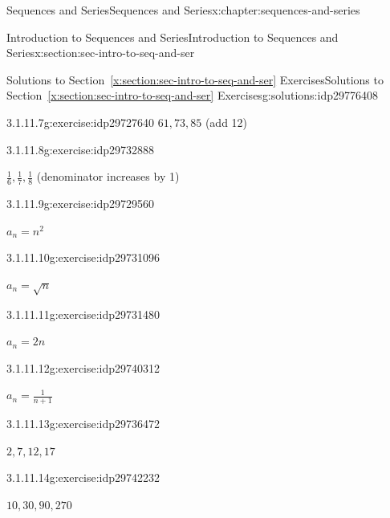 \documentclass[twoside,10pt,]{book}
\newcommand{\xreffont}{\relax}
\numberwithin{equation}{section}
\begin{document}
\begin{chapterptx}{Sequences and Series}{}{Sequences and Series}{}{}{x:chapter:sequences-and-series}
\begin{sectionptx}{Introduction to Sequences and Series}{}{Introduction to Sequences and Series}{}{}{x:section:sec-intro-to-seq-and-ser}
\begin{solutions-subsection}{Solutions to Section~{\xreffont\ref*{x:section:sec-intro-to-seq-and-ser}} Exercises}{}{Solutions to Section~{\xreffont\ref*{x:section:sec-intro-to-seq-and-ser}} Exercises}{}{}{g:solutions:idp29776408}
\begin{exercisegroup}
\begin{divisionsolutioneg}{3.1.11.7}{}{g:exercise:idp29727640}
\noindent\hypertarget{g:solution:idp29730712-main}{}\(61, 73, 85\) (add 12)\end{divisionsolutioneg}%
\begin{divisionsolutioneg}{3.1.11.8}{}{g:exercise:idp29732888}%
\par\smallskip%
\noindent\hypertarget{g:solution:idp29728920-main}{}\(\frac{1}{6},\frac{1}{7},\frac{1}{8}\) (denominator increases by 1)\end{divisionsolutioneg}%
\end{exercisegroup}
\par\medskip\noindent
\begin{exercisegroup}
\begin{divisionsolutioneg}{3.1.11.9}{}{g:exercise:idp29729560}%
\par\smallskip%
\noindent\hypertarget{g:solution:idp29728024-main}{}\(a_n = n^2\)\end{divisionsolutioneg}%
\begin{divisionsolutioneg}{3.1.11.10}{}{g:exercise:idp29731096}%
\par\smallskip%
\noindent\hypertarget{g:solution:idp29727384-main}{}\(a_n = \sqrt{n} \)\end{divisionsolutioneg}%
\begin{divisionsolutioneg}{3.1.11.11}{}{g:exercise:idp29731480}%
\par\smallskip%
\noindent\hypertarget{g:solution:idp29728536-main}{}\(a_n = 2n\)\end{divisionsolutioneg}%
\begin{divisionsolutioneg}{3.1.11.12}{}{g:exercise:idp29740312}%
\par\smallskip%
\noindent\hypertarget{g:solution:idp29736600-main}{}\(a_n = \frac{1}{n + 1}\)\end{divisionsolutioneg}%
\end{exercisegroup}
\par\medskip\noindent
\begin{exercisegroup}
\begin{divisionsolutioneg}{3.1.11.13}{}{g:exercise:idp29736472}%
\par\smallskip%
\noindent\hypertarget{g:solution:idp29737112-main}{}\(2, 7, 12, 17\)\end{divisionsolutioneg}%
\begin{divisionsolutioneg}{3.1.11.14}{}{g:exercise:idp29742232}%
\par\smallskip%
\noindent\hypertarget{g:solution:idp29739672-main}{}\(10, 30, 90, 270\)\end{divisionsolutioneg}%

\end{exercisegroup}
\end{solutions-subsection}
\end{sectionptx}
\end{chapterptx}
\end{document}
